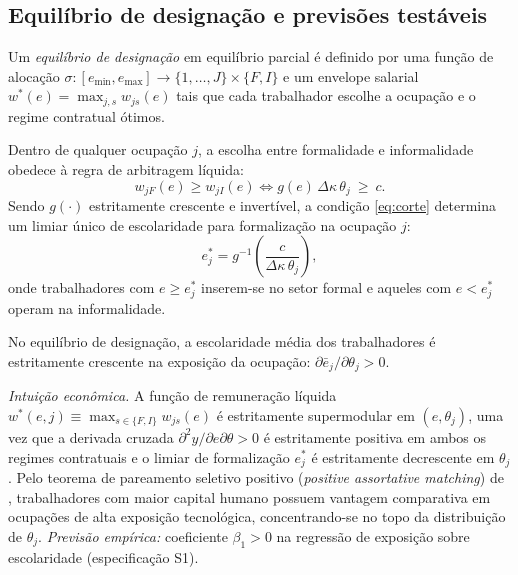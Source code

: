 \subsection{Equilíbrio de designação e previsões testáveis}

Um \emph{equilíbrio de designação} em equilíbrio parcial é definido por uma função de alocação $\sigma: [e_{\min}, e_{\max}] \to \{1, \dots, J\} \times \{F, I\}$ e um envelope salarial $w^*(e) = \max_{j, s} w_{js}(e)$ tais que cada trabalhador escolhe a ocupação e o regime contratual ótimos.

Dentro de qualquer ocupação $j$, a escolha entre formalidade e informalidade obedece à regra de arbitragem líquida:
\begin{equation}
    w_{jF}(e) \ge w_{jI}(e) \iff g(e) \, \Delta\kappa \, \theta_j \ \ge \ c.
    \label{eq:corte}
\end{equation}
Sendo $g(\cdot)$ estritamente crescente e invertível, a condição \eqref{eq:corte} determina um limiar único de escolaridade para formalização na ocupação $j$:
\begin{equation}
    e^*_j = g^{-1}\!\left(\frac{c}{\Delta\kappa \, \theta_j}\right),
    \label{eq:limiar}
\end{equation}
onde trabalhadores com $e \ge e^*_j$ inserem-se no setor formal e aqueles com $e < e^*_j$ operam na informalidade.

\begin{proposicao}
\label{prop:gradiente}
No equilíbrio de designação, a escolaridade média dos trabalhadores é estritamente crescente na exposição da ocupação: $\partial \bar{e}_j / \partial \theta_j > 0$.
\end{proposicao}

\textit{Intuição econômica.} A função de remuneração líquida $w^*(e, j) \equiv \max_{s \in \{F, I\}} w_{js}(e)$ é estritamente supermodular em $(e, \theta_j)$, uma vez que a derivada cruzada $\partial^2 y / \partial e \partial \theta > 0$ é estritamente positiva em ambos os regimes contratuais e o limiar de formalização $e_j^*$ é estritamente decrescente em $\theta_j$. Pelo teorema de pareamento seletivo positivo (\emph{positive assortative matching}) de \citet{becker1973theory}, trabalhadores com maior capital humano possuem vantagem comparativa em ocupações de alta exposição tecnológica, concentrando-se no topo da distribuição de $\theta_j$. \emph{Previsão empírica:} coeficiente $\beta_1 > 0$ na regressão de exposição sobre escolaridade (especificação S1).

